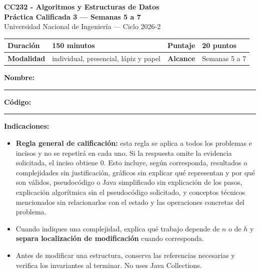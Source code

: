\documentclass[10pt,a4paper]{article}
\begin{document}
\begin{center}
{\Large\bfseries CC232 - Algoritmos y Estructuras de Datos}\\[2pt]
{\large\bfseries Práctica Calificada 3 --- Semanas 5 a 7}\\[1pt]
{\footnotesize Universidad Nacional de Ingeniería --- Ciclo 2026-2}
\end{center}

\vspace{-4pt}
\begin{center}
\footnotesize
\begin{tabularx}{\textwidth}{|l|X|l|X|}
\hline
\textbf{Duración} & 150 minutos & \textbf{Puntaje} & 20 puntos \\ \hline
\textbf{Modalidad} & individual, presencial, lápiz y papel & \textbf{Alcance} & Semanas 5 a 7 \\ \hline
\end{tabularx}
\end{center}

\vspace{-2pt}
{\footnotesize \textbf{Nombre:} \rule{9.5cm}{0.4pt} \hfill \textbf{Código:} \rule{3.8cm}{0.4pt}}

\vspace{2pt}
\begin{tcolorbox}[enhanced,sharp corners,colback=white,colframe=black!75,boxrule=0.4pt,left=5pt,right=5pt,top=3pt,bottom=3pt]
\scriptsize
\textbf{Indicaciones:}
\begin{itemize}[leftmargin=10pt,itemsep=0.5pt,topsep=1pt]
\item \textbf{Regla general de calificación:} esta regla se aplica a todos los problemas e incisos y no se repetirá en cada uno. Si la respuesta omite la evidencia solicitada, el inciso obtiene 0. Esto incluye, según corresponda, resultados o complejidades sin justificación, gráficos sin explicar qué representan y por qué son válidos, pseudocódigo o Java simplificado sin explicación de los pasos, explicación algorítmica sin el pseudocódigo solicitado, y conceptos técnicos mencionados sin relacionarlos con el estado y las operaciones concretas del problema.
\item Cuando indiques una complejidad, explica qué trabajo depende de $n$ o de $h$ y \textbf{separa localización de modificación} cuando corresponda.
\item Antes de modificar una estructura, conserva las referencias necesarias y verifica los invariantes al terminar. No uses Java Collections.
\end{itemize}
\end{tcolorbox}
\end{document}
